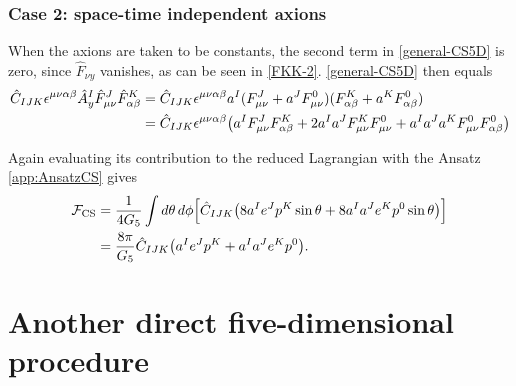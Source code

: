 \documentclass[12pt,twoside]{book}
\begin{document}
\begin{appendices}
\subsection{Case 2: space-time independent axions}\label{app:DR-CS-GJ-12}
\label{app:axions}

When the axions are taken to be constants, the second term in \eqref{general-CS5D} is zero, since $\hat{F}_{\nu y}$ vanishes, as can be seen in \eqref{FKK-2}. \eqref{general-CS5D} then equals
\begin{align}
\hat{C}_{IJK} \epsilon^{\mu\nu\alpha\beta} \hat{A}^{I}_{y}\hat{F}^{J}_{\mu\nu} \hat{F}^{K}_{\alpha\beta}
&= \hat{C}_{IJK} \epsilon^{\mu\nu\alpha\beta}
a^{I}(F^{J}_{\mu\nu} + a^{J}F^{0}_{\mu\nu})(F^{K}_{\alpha\beta} + a^{K}F^{0}_{\alpha\beta}) \notag\\
&= \hat{C}_{IJK} \epsilon^{\mu\nu\alpha\beta}
\big(
a^{I}F^{J}_{\mu\nu}F^{K}_{\alpha\beta} + 2a^{I}a^{J}F^{K}_{\mu\nu}F^{0}_{\mu\nu}
+ a^{I}a^{J}a^{K}F^{0}_{\mu\nu}F^{0}_{\alpha\beta}
\big)
\end{align}

Again evaluating its contribution to the reduced Lagrangian with the Ansatz \eqref{app:AnsatzCS} gives
\begin{align}
\mathcal{F}_{\mathrm{CS}} &= \frac{1}{4 G_{5}} \int d\theta\, d\phi \Big[
\hat{C}_{IJK}\big(
8 a^{I}e^{J}p^{K}\sin\theta + 8 a^{I}a^{J}e^{K}p^{0} \sin\theta
\big) \Big]\notag \\
\label{eq:axions}
&= \frac{8\pi}{G_{5}}\hat{C}_{IJK}\big( a^{I}e^{J}p^{K} + a^{I}a^{J}e^{K}p^{0} \big).
\end{align}


\newpage
\thispagestyle{empty}
\chapter{Another direct five-dimensional procedure}
\label{inspirationDirect5D}


\end{appendices}
\end{document}
